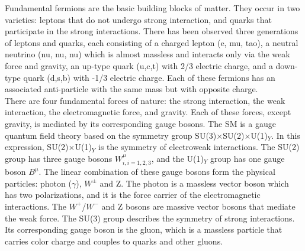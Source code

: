 \documentclass[thesis.tex]{subfiles}
\begin{document}
Fundamental fermions are the basic building blocks of matter. 
They occur in two varieties: leptons that do not undergo strong interaction, and quarks that participate in the strong interactions. 
There has been observed three generations of leptons and quarks, each consisting of a charged lepton (e, mu, tao), a neutral neutrino (nu, nu, nu) which is almost massless and interacts only via the weak force and gravity, an up-type quark (u,c,t) with 2/3 electric charge, and a down-type quark (d,s,b) with -1/3 electric charge. 
Each of these fermions has an associated anti-particle with the same mass but with opposite charge. \\

There are four fundamental forces of nature: the strong interaction, the weak interaction, the electromagnetic force, and gravity. 
Each of these forces, except gravity, is mediated by its corresponding gauge bosons. 
The SM is a gauge quantum field theory based on the symmetry group SU(3)$\times$SU(2)$\times$U(1)$_Y$. In this expression, SU(2)$\times$U(1)$_Y$ is the symmetry of electroweak interactions. The SU(2) group has three gauge bosons $W_{i, i = 1,2,3}^{\mu}$, and the U(1)$_Y$ group has one gauge boson $B^{\mu}$. 
The linear combination of these gauge bosons form the physical particles: photon ($\gamma$), $W^{\pm}$ and Z. 
The photon is a massless vector boson which has two polarizations, and it is the force carrier of the electromagnetic interactions. 
The $W^+$/$W^{-}$ and Z bosons are massive vector bosons that mediate the weak force. 
The SU(3) group describes the symmetry of strong interactions. Its corresponding gauge boson is the gluon, which is a massless particle that carries color charge and couples to quarks and other gluons. \\
 
\end{document}
